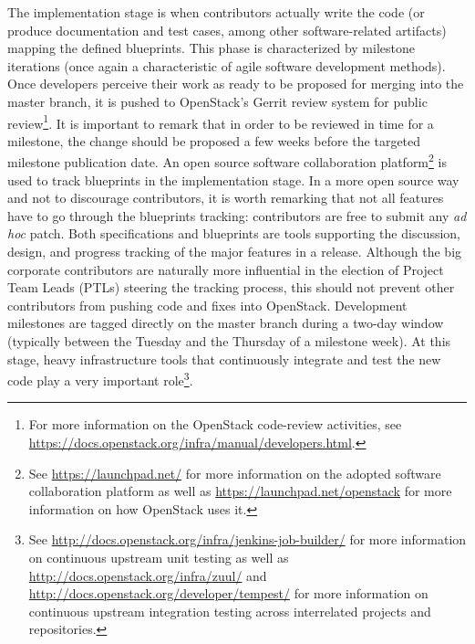 The implementation stage is when contributors actually write the code (or produce documentation and test cases, among other 
software-related artifacts) mapping the defined blueprints. This phase is characterized by milestone iterations (once again a 
characteristic of agile software development methods). Once developers perceive their work as ready to be proposed for merging into 
the master branch, it is pushed to OpenStack's Gerrit review system for public review\footnote{For more information on the OpenStack 
code-review activities, see \url{https://docs.openstack.org/infra/manual/developers.html}.}. It is important to remark that in order to be reviewed in time for a milestone, the change should be proposed a few weeks before the targeted milestone publication date. An open source software collaboration platform\footnote{See \url{https://launchpad.net/} for more information on the adopted software collaboration platform as well as \url{https://launchpad.net/openstack} for more information on how OpenStack uses it.}  is used to track blueprints in the implementation stage. In a more open source way and not to discourage contributors, it is worth remarking that not all features have to go through the blueprints tracking: contributors are free to submit any \emph{ad hoc} patch. Both specifications and blueprints are tools supporting the discussion, design, and progress tracking of the major features in a release. Although the big corporate contributors are naturally more influential in the election of Project Team Leads (PTLs) steering the tracking process, this should not prevent other contributors from pushing code and fixes into OpenStack. Development milestones are tagged directly on the master branch during a two-day window (typically between the Tuesday and the Thursday of a milestone week). At this stage, heavy infrastructure tools that continuously integrate and test the new code play a very important role\footnote{See \url{http://docs.openstack.org/infra/jenkins-job-builder/} for more information on continuous upstream unit testing as well as  \url{http://docs.openstack.org/infra/zuul/} and \url{http://docs.openstack.org/developer/tempest/} for more information on continuous upstream integration testing across interrelated projects and repositories.}.



